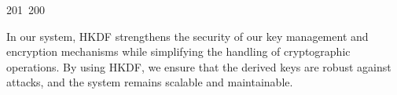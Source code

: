 201~200~\documentclass{article}
\begin{document}
	                                                                                                                                                                                                                                                                                                	                                                                                                                                        	    	                                                                                                	                                                                                                                                                                                                                                                                        In our system, HKDF strengthens the security of our key management and encryption mechanisms while simplifying the handling of cryptographic operations. By using HKDF, we ensure that the derived keys are robust against attacks, and the system remains scalable and maintainable.
\end{document}
